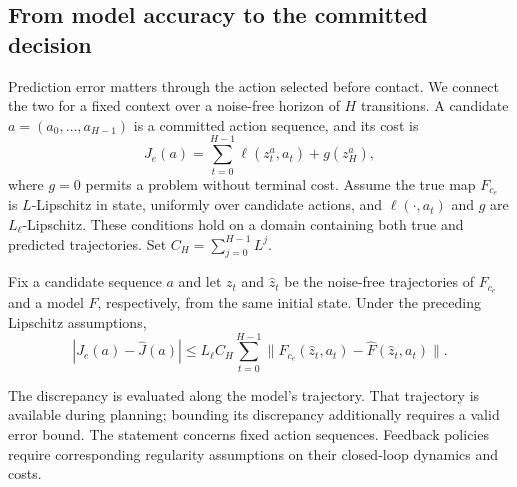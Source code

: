 \subsection{From model accuracy to the committed decision}
Prediction error matters through the action selected before contact. We connect the two for a fixed context over a noise-free horizon of $H$ transitions. A candidate $a=(a_0,\ldots,a_{H-1})$ is a committed action sequence, and its cost is
\begin{equation}\label{eq:horizoncost}
J_e(a)=\sum_{t=0}^{H-1}\ell(z_t^a,a_t)+g(z_H^a),
\end{equation}
where $g=0$ permits a problem without terminal cost. Assume the true map $F_{c_e}$ is $L$-Lipschitz in state, uniformly over candidate actions, and $\ell(\cdot,a_t)$ and $g$ are $L_\ell$-Lipschitz. These conditions hold on a domain containing both true and predicted trajectories. Set $C_H=\sum_{j=0}^{H-1}L^j$.

\begin{lemma}\label{lem:simulation}
Fix a candidate sequence $a$ and let $z_t$ and $\widehat z_t$ be the noise-free trajectories of $F_{c_e}$ and a model $\widehat F$, respectively, from the same initial state. Under the preceding Lipschitz assumptions,
\begin{equation}\label{eq:simulationbound}
|J_e(a)-\widehat J(a)|
\le L_\ell C_H\sum_{t=0}^{H-1}
\bigl\|F_{c_e}(\widehat z_t,a_t)-\widehat F(\widehat z_t,a_t)\bigr\|.
\end{equation}
\end{lemma}
The discrepancy is evaluated along the model's trajectory. That trajectory is available during planning; bounding its discrepancy additionally requires a valid error bound. The statement concerns fixed action sequences. Feedback policies require corresponding regularity assumptions on their closed-loop dynamics and costs.

